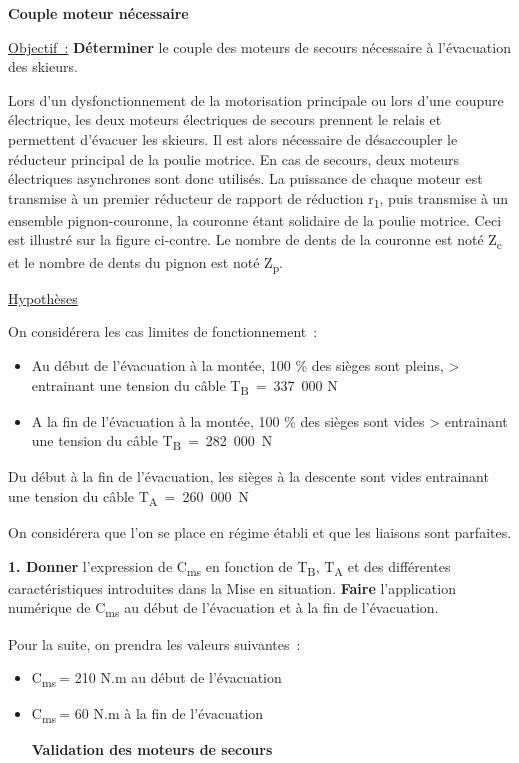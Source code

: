 \textbf{Couple moteur nécessaire}

\ul{Objectif~:} \textbf{Déterminer} le couple des moteurs de secours nécessaire à l'évacuation des skieurs.

Lors d'un dysfonctionnement de la motorisation principale ou lors d'une coupure électrique, les deux moteurs électriques de secours prennent le relais et permettent d'évacuer les skieurs. Il est alors nécessaire de désaccoupler le réducteur principal de la poulie motrice. En cas de secours, deux moteurs électriques asynchrones sont donc utilisés. La puissance de chaque moteur est transmise à un premier réducteur de rapport de réduction r\textsubscript{1}, puis transmise à un ensemble pignon-couronne, la couronne étant solidaire de la poulie motrice. Ceci est illustré sur la figure ci-contre. Le nombre de dents de la couronne est noté Z\textsubscript{c} et le nombre de dents du pignon est noté Z\textsubscript{p}.

\ul{Hypothèses}

On considérera les cas limites de fonctionnement~:

\begin{itemize}
\item
  Au début de l'évacuation à la montée, 100 \% des sièges sont pleins, \textgreater{} entrainant une tension du câble T\textsubscript{B}~=~337~000 N
\item
  A la fin de l'évacuation à la montée, 100 \% des sièges sont vides \textgreater{} entrainant une tension du câble T\textsubscript{B}~=~282~000~N
\end{itemize}

Du début à la fin de l'évacuation, les sièges à la descente sont vides entrainant une tension du câble T\textsubscript{A}~=~260~000~N

On considérera que l'on se place en régime établi et que les liaisons sont parfaites.

\textbf{1. Donner} l'expression de C\textsubscript{ms} en fonction de T\textsubscript{B}, T\textsubscript{A} et des différentes caractéristiques introduites dans la Mise en situation. \textbf{Faire} l'application numérique de C\textsubscript{ms} au début de l'évacuation et à la fin de l'évacuation.

Pour la suite, on prendra les valeurs suivantes~:

\begin{itemize}
\item
  C\textsubscript{ms}\(\ \)= 210 N.m au début de l'évacuation
\item
  C\textsubscript{ms}\(\ \)= 60 N.m à la fin de l'évacuation

  \textbf{Validation des moteurs de secours}
\end{itemize}

